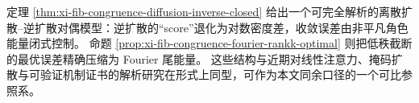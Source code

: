 \begin{remark}\label{rem:xi-fib-congruence-external-mirror-diffusion-attention}
定理 \ref{thm:xi-fib-congruence-diffusion-inverse-closed} 给出一个可完全解析的离散扩散--逆扩散对偶模型：逆扩散的“score”退化为对数密度差，收敛误差由非平凡角色能量闭式控制。
命题 \ref{prop:xi-fib-congruence-fourier-rankk-optimal} 则把低秩截断的最优误差精确压缩为 Fourier 尾能量。
这些结构与近期对线性注意力、掩码扩散与可验证机制证书的解析研究在形式上同型，可作为本文同余口径的一个可比参照系。\cite{LeeSohnLee2026LinearAttentionICLNoForgetting,LiangTanShroffLiang2026MaskedDiffusionSharpTV,HadadKatzBassan2026AutomatedCircuitDiscoveryProvable}
\end{remark}

\endinput

